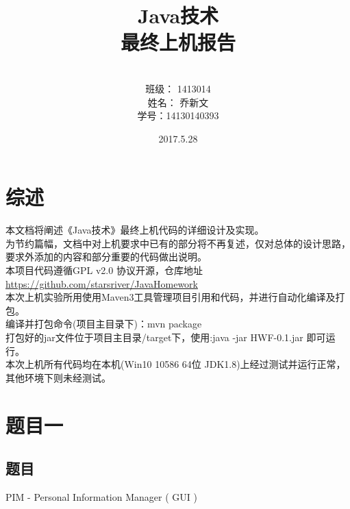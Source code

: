 \documentclass[a4paper]{article}
\begin{document}
\title{\Huge Java技术\\ 最终上机报告}
\author { \vspace{12cm} \\ \LARGE 班级：  1413014  \\ \LARGE 姓名：  乔新文   \\ \LARGE 学号：14130140393} 
\date{ \vspace{4cm} 2017.5.28}

\maketitle
\clearpage

\tableofcontents

\clearpage

\section{综述}

本文档将阐述《Java技术》最终上机代码的详细设计及实现。\\

为节约篇幅，文档中对上机要求中已有的部分将不再复述，仅对总体的设计思路，要求外添加的内容和部分重要的代码做出说明。\\

本项目代码遵循GPL v2.0 协议开源，仓库地址 \url{https://github.com/starsriver/JavaHomework} \\

本次上机实验所用使用Maven3工具管理项目引用和代码，并进行自动化编译及打包。\\

编译并打包命令(项目主目录下)：mvn package \\

打包好的jar文件位于项目主目录/target下，使用:java -jar HWF-0.1.jar 即可运行。\\

本次上机所有代码均在本机(Win10 10586 64位 JDK1.8)上经过测试并运行正常，其他环境下则未经测试。

\section{题目一}

\subsection{题目}

PIM - Personal Information Manager ( GUI )
\end{document}
